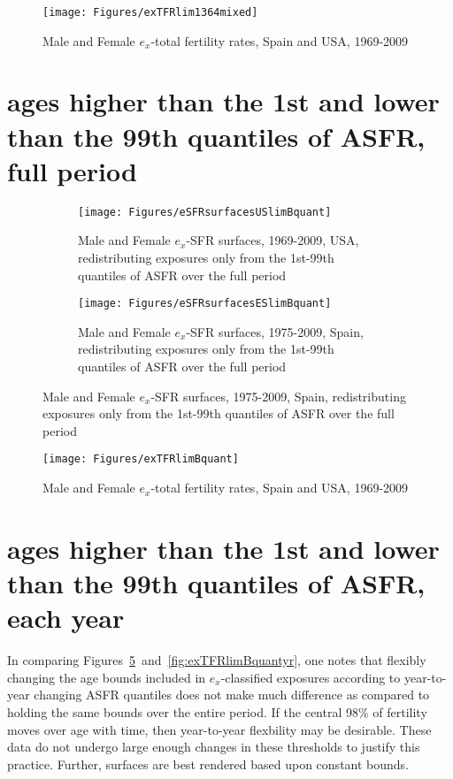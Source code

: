 \begin{figure}[ht!]
        \centering  
          \caption{Male and Female $e_x$-total fertility rates, Spain
          and USA, 1969-2009}
           \texttt{[image: Figures/exTFRlim1364mixed]}
          \label{fig:exTFRlim13_64}
\end{figure}

\pagebreak
\section{ages higher than the 1st and lower than the 99th quantiles of ASFR,
full period}
\label{sec:quant}
\begin{figure}[ht!]
        \centering
        \begin{subfigure}
                \centering
                \caption{Male and Female $e_x$-SFR surfaces, 1969-2009, USA,
                redistributing exposures only from the 1st-99th quantiles of
                ASFR over the full period}
                \texttt{[image: Figures/eSFRsurfacesUSlimBquant]}
                \label{fig:exSFRsurfUSlimBquant}
        \end{subfigure}
        \begin{subfigure}
                \centering
                \caption{Male and Female $e_x$-SFR surfaces, 1975-2009, Spain,
                redistributing exposures only from the 1st-99th quantiles of
                ASFR over the full period}
                \texttt{[image: Figures/eSFRsurfacesESlimBquant]} 
                \label{fig:exSFRsurfESlimBquant}
        \end{subfigure}
\end{figure}

\begin{figure}[ht!]
        \centering  
          \caption{Male and Female $e_x$-total fertility rates, Spain
          and USA, 1969-2009}
           \texttt{[image: Figures/exTFRlimBquant]}
          \label{fig:exTFRlimBquant}
\end{figure}
\pagebreak

\section{ages higher than the 1st and lower than the 99th quantiles of ASFR,
each year}
\label{sec:quantan}
In comparing Figures~\ref{fig:exTFRlimBquant}~and~\ref{fig:exTFRlimBquantyr},
one notes that flexibly changing the age bounds included in $e_x$-classified
exposures according to year-to-year changing ASFR quantiles does not make much
difference as compared to holding the same bounds over the entire period. If
the central 98\% of fertility moves over age with time, then year-to-year
flexbility may be desirable. These data do not undergo large enough changes in
these thresholds to justify this practice. Further, surfaces are best rendered
based upon constant bounds.

